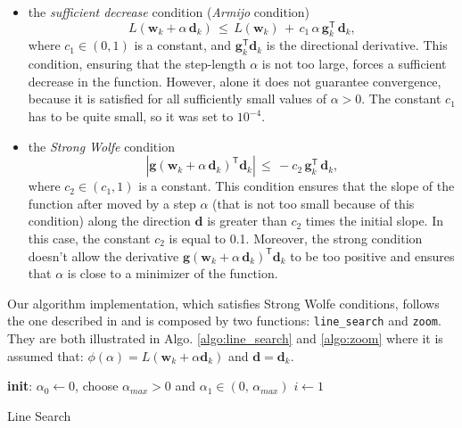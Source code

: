 \begin{itemize}
    \item the \emph{sufficient decrease} condition (\emph{Armijo} condition)
    \begin{equation}
        L(\mathbf{w}_k + \alpha \, \mathbf{d}_k) \, \leq \, L(\mathbf{w}_k)\, + \, c_1 \, \alpha \, \mathbf{g}_k^\mathsf{T} \, \mathbf{d}_k,
    \end{equation}
    where $c_1 \in (0,1)$ is a constant, and  $\mathbf{g}_k^\mathsf{T}\mathbf{d}_k$ is the directional derivative. This condition, ensuring that the step-length $\alpha$ is not too large, forces a sufficient decrease in the function. However, alone it does not guarantee convergence, because it is satisfied for all sufficiently small values of $\alpha >0$. The constant $c_1$ has to be quite small, so it was set to $10^{-4}$. 
    \item the \emph{Strong Wolfe} condition
    \begin{equation}
        |\mathbf{g}(\mathbf{w}_k + \alpha \, \mathbf{d}_k)^\mathsf{T} \mathbf{d}_k|\, \leq  \, - c_2 \, \mathbf{g}_k^\mathsf{T} \, \mathbf{d}_k,
    \end{equation}
    where $c_2 \in (c_1,1)$ is a constant. This condition ensures that the slope of the function after moved by a step $\alpha$ (that is not too small because of this condition) along the direction $\mathbf{d}$ is greater than $c_2$ times the initial slope. In this case, the constant $c_2$ is equal to 0.1.  Moreover, the strong condition doesn't allow the derivative $\mathbf{g}(\mathbf{w}_k + \alpha \, \mathbf{d}_k)^\mathsf{T} \mathbf{d}_k$ to be too positive and ensures that $\alpha$ is close to a minimizer of the function.
\end{itemize}
Our algorithm implementation, which satisfies Strong Wolfe conditions, follows the one described in \cite{Nocedal} and is composed by two functions: \verb|line_search| and \verb|zoom|. They are both illustrated in Algo. \ref{algo:line_search} and \ref{algo:zoom} where it is assumed that: $\phi(\alpha) = L(\mathbf{w}_k + \alpha \mathbf{d}_k)$ and $\mathbf{d} = \mathbf{d}_k$. 

\begin{algorithm}[H]
\label{algo:line_search}
\SetAlgoLined
 \textbf{init}: $\alpha_0 \leftarrow 0$, choose $\alpha_{max} > 0$ and $\alpha_1 \in (0, \, \alpha_{max})$\;
 $i \leftarrow 1$\;
 \caption{Line Search}
\end{algorithm}

